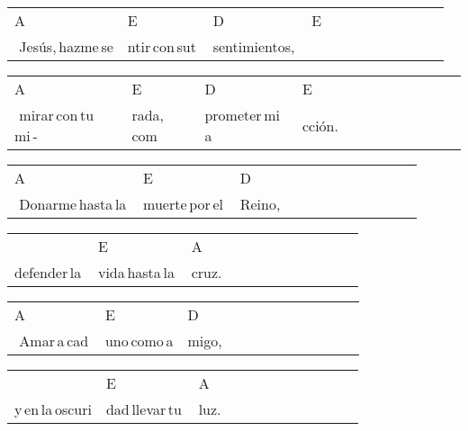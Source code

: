 \begin{multicols}{2}
\noindent
\begin{minipage}{\columnwidth}
\noindent
\noindent
\begin{tabular}{llllllllllll}
A&E&D&E\\
\,\,Jesús,\,hazme\,se&ntir\,con\,sut\,&sentimientos,\,&
\end{tabular}

\noindent
\begin{tabular}{llllllllllll}
A&E&D&E\\
\,\,mirar\,con\,tu\,mi\,-\,&rada,\,com&prometer\,mi\,a&cción.
\end{tabular}

\noindent
\begin{tabular}{llllllllllll}
A&E&D\\
\,\,Donarme\,hasta\,la\,&muerte\,por\,el\,&Reino,
\end{tabular}

\noindent
\begin{tabular}{llllllllllll}
&E&A\\
defender\,la\,&vida\,hasta\,la\,&cruz.
\end{tabular}

\noindent
\begin{tabular}{llllllllllll}
A&E&D\\
\,\,Amar\,a\,cad\,&uno\,como\,a&migo,
\end{tabular}

\noindent
\begin{tabular}{llllllllllll}
&E&A\\
y\,en\,la\,oscuri&dad\,llevar\,tu\,&luz.
\end{tabular}
\end{minipage}\\


\chorus{}

\end{multicols}